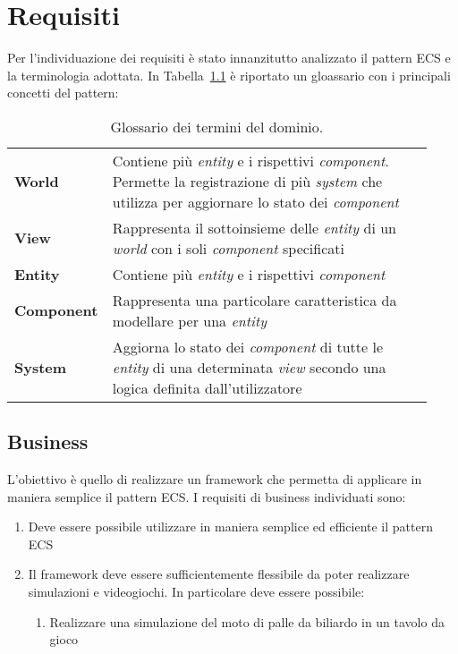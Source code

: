 \chapter{Requisiti}\label{ch:requisiti}
Per l'individuazione dei requisiti è stato innanzitutto analizzato il pattern ECS e la terminologia adottata.
In Tabella~\ref{tab:glossario} è riportato un gloassario con i principali concetti del pattern:
\begin{table}[H]
    \begin{tabular}{p{0.17\linewidth}p{0.76\linewidth}}
        \toprule
        \textbf{World}     & Contiene più \textit{entity} e i rispettivi \textit{component}.
        Permette la registrazione di più \textit{system} che utilizza per aggiornare lo stato dei \textit{component} \\
        \textbf{View}      & Rappresenta il sottoinsieme delle \textit{entity} di un \textit{world} con i soli \textit{component} specificati \\
        \textbf{Entity}    & Contiene più \textit{entity} e i rispettivi \textit{component}                                                                                                           \\
        \textbf{Component} & Rappresenta una particolare caratteristica da modellare per una \textit{entity}                                                                                              \\
        \textbf{System}    & Aggiorna lo stato dei \textit{component} di tutte le \textit{entity} di una determinata \textit{view} secondo una logica definita dall'utilizzatore                          \\
        \bottomrule
    \end{tabular}\caption{\label{tab:glossario}Glossario dei termini del dominio.}
\end{table}

\section{Business}\label{sec:business}
L'obiettivo è quello di realizzare un framework che permetta di applicare in maniera semplice il pattern ECS\@.
I requisiti di business individuati sono:
\begin{enumerate}[label=\textbf{\ref{sec:business}.\arabic*}]
    \item \label{itm:b1} Deve essere possibile utilizzare in maniera semplice ed efficiente il pattern ECS
    \item \label{itm:b2} Il framework deve essere sufficientemente flessibile da poter realizzare simulazioni e videogiochi.
    In particolare deve essere possibile:
    \begin{enumerate}[label=\textbf{\ref{itm:b2}.\arabic*}]
        \item \label{itm:bb3} Realizzare una simulazione del moto di palle da biliardo in un tavolo da gioco
    \end{enumerate}
\end{enumerate}

